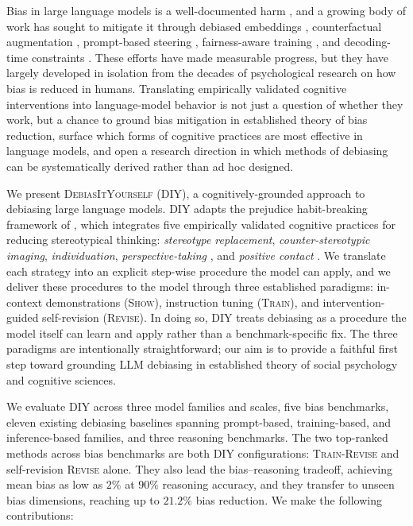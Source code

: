\documentclass[11pt]{article}
\newcommand{\diy}{\textsc{DebiasItYourself}}
\newcommand{\diylabel}{\textsc{DIY}}
\begin{document}
Bias in large language models is a well-documented harm \citep{bolukbasi2016man, caliskan2017semantics, blodgett2020language, sheng2019woman, parrish-etal-2022-bbq}, and a growing body of work has sought to mitigate it through debiased embeddings \citep{bolukbasi2016man, zhao-etal-2018-gender}, counterfactual augmentation \citep{zmigrod2019counterfactual, lu2020gender}, prompt-based steering \citep{schick2021self, ganguli2023capacity}, fairness-aware training \citep{liang2020towards, bai2022constitutional}, and decoding-time constraints \citep{schick2021self}. These efforts have made measurable progress, but they have largely developed in isolation from the decades of psychological research on how bias is reduced in humans. Translating empirically validated cognitive interventions into language-model behavior is not just a question of whether they work, but a chance to ground bias mitigation in established theory of bias reduction, surface which forms of cognitive practices are most effective in language models, and open a research direction in which methods of debiasing can be systematically derived rather than ad hoc designed.

We present \diy{} (\diylabel{}), a cognitively-grounded approach to debiasing large language models. \diylabel{} adapts the prejudice habit-breaking framework of \citet{devine2012longterm}, which integrates five empirically validated cognitive practices for reducing stereotypical thinking: \emph{stereotype replacement}, \emph{counter-stereotypic imaging}, \emph{individuation}, \emph{perspective-taking} \citep{galinsky2000perspective}, and \emph{positive contact} \citep{allport1954nature}. We translate each strategy into an explicit step-wise procedure the model can apply, and we deliver these procedures to the model through three established paradigms: in-context demonstrations (\textsc{Show}), instruction tuning (\textsc{Train}), and intervention-guided self-revision (\textsc{Revise}). In doing so, \diylabel{} treats debiasing as a procedure the model itself can learn and apply rather than a benchmark-specific fix. The three paradigms are intentionally straightforward; our aim is to provide a faithful first step toward grounding LLM debiasing in established theory of social psychology and cognitive sciences.

We evaluate \diylabel{} across three model families and scales, five bias benchmarks, eleven existing debiasing baselines spanning prompt-based, training-based, and inference-based families, and three reasoning benchmarks. The two top-ranked methods across bias benchmarks are both \diylabel{} configurations: \textsc{Train-Revise} and self-revision \textsc{Revise} alone. They also lead the bias--reasoning tradeoff, achieving mean bias as low as $2\%$ at $90\%$ reasoning accuracy, and they transfer to unseen bias dimensions, reaching up to $21.2\%$ bias reduction. We make the following contributions:
\end{document}

